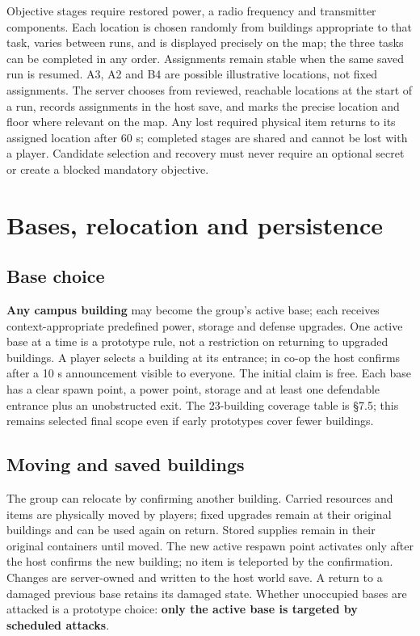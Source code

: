 Objective stages require restored power, a radio frequency and transmitter components. Each location is chosen randomly from buildings appropriate to that task, varies between runs, and is displayed precisely on the map; the three tasks can be completed in any order. Assignments remain stable when the same saved run is resumed. A3, A2 and B4 are possible illustrative locations, not fixed assignments. The server chooses from reviewed, reachable locations at the start of a run, records assignments in the host save, and marks the precise location and floor where relevant on the map. Any lost required physical item returns to its assigned location after 60 s; completed stages are shared and cannot be lost with a player. Candidate selection and recovery must never require an optional secret or create a blocked mandatory objective.


\section{Bases, relocation and persistence}

\subsection{Base choice}
\textbf{Any campus building} may become the group's active base; each receives context-appropriate predefined power, storage and defense upgrades. One active base at a time is a prototype rule, not a restriction on returning to upgraded buildings. A player selects a building at its entrance; in co-op the host confirms after a 10 s announcement visible to everyone. The initial claim is free. Each base has a clear spawn point, a power point, storage and at least one defendable entrance plus an unobstructed exit. The 23-building coverage table is §7.5; this remains selected final scope even if early prototypes cover fewer buildings.


\subsection{Moving and saved buildings}
The group can relocate by confirming another building. Carried resources and items are physically moved by players; fixed upgrades remain at their original buildings and can be used again on return. Stored supplies remain in their original containers until moved. The new active respawn point activates only after the host confirms the new building; no item is teleported by the confirmation. Changes are server-owned and written to the host world save. A return to a damaged previous base retains its damaged state. Whether unoccupied bases are attacked is a prototype choice: \textbf{only the active base is targeted by scheduled attacks}.


